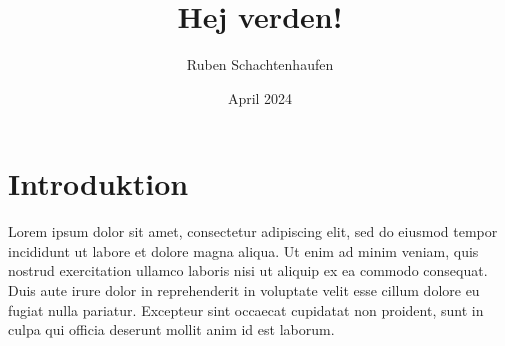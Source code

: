 \documentclass{article}
\title{Hej verden!}
\author{Ruben Schachtenhaufen}
\date{April 2024}
\begin{document}
\maketitle
\section{Introduktion}

Lorem ipsum dolor sit amet, consectetur adipiscing elit, sed do eiusmod tempor incididunt ut labore et dolore magna aliqua. Ut enim ad minim veniam, quis nostrud exercitation ullamco laboris nisi ut aliquip ex ea commodo consequat. Duis aute irure dolor in reprehenderit in voluptate velit esse cillum dolore eu fugiat nulla pariatur. Excepteur sint occaecat cupidatat non proident, sunt in culpa qui officia deserunt mollit anim id est laborum.
\newline

\\ \\ %

\\ \\

\\ \\

\\ \\

\\ \\

\\ \\

\end{document}

